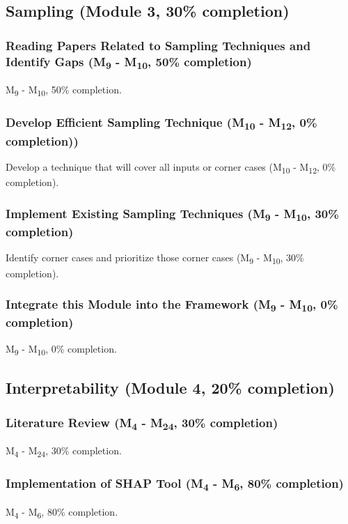 \subsection{Sampling (Module 3, 30\% completion)}
\subsubsection{Reading Papers Related to Sampling Techniques and Identify Gaps (M\textsubscript{9} - M\textsubscript{10}, 50\% completion)}
M\textsubscript{9} - M\textsubscript{10}, 50\% completion.

\subsubsection{Develop Efficient Sampling Technique (M\textsubscript{10} - M\textsubscript{12}, 0\% completion))}
Develop a technique that will cover all inputs or corner cases (M\textsubscript{10} - M\textsubscript{12}, 0\% completion).

\subsubsection{Implement Existing Sampling Techniques (M\textsubscript{9} - M\textsubscript{10}, 30\% completion)}
Identify corner cases and prioritize those corner cases (M\textsubscript{9} - M\textsubscript{10}, 30\% completion).

\subsubsection{Integrate this Module into the Framework (M\textsubscript{9} - M\textsubscript{10}, 0\% completion)}
M\textsubscript{9} - M\textsubscript{10}, 0\% completion.

\subsection{Interpretability (Module 4, 20\% completion)}
\subsubsection{Literature Review (M\textsubscript{4} - M\textsubscript{24}, 30\% completion)}
M\textsubscript{4} - M\textsubscript{24}, 30\% completion.

\subsubsection{Implementation of SHAP Tool (M\textsubscript{4} - M\textsubscript{6}, 80\% completion)}
M\textsubscript{4} - M\textsubscript{6}, 80\% completion.

